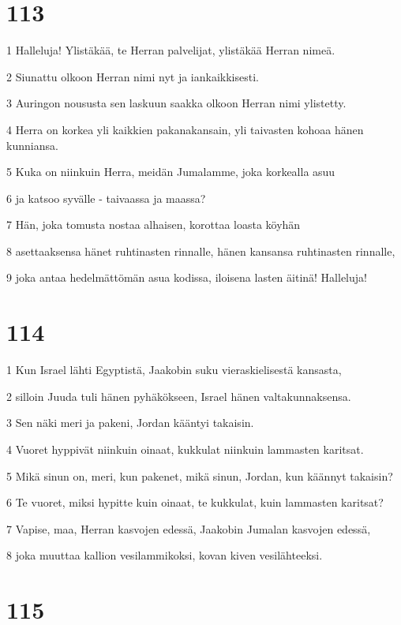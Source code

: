 \chapter{113}

\par 1 Halleluja! Ylistäkää, te Herran palvelijat, ylistäkää Herran nimeä.
\par 2 Siunattu olkoon Herran nimi nyt ja iankaikkisesti.
\par 3 Auringon noususta sen laskuun saakka olkoon Herran nimi ylistetty.
\par 4 Herra on korkea yli kaikkien pakanakansain, yli taivasten kohoaa hänen kunniansa.
\par 5 Kuka on niinkuin Herra, meidän Jumalamme, joka korkealla asuu
\par 6 ja katsoo syvälle - taivaassa ja maassa?
\par 7 Hän, joka tomusta nostaa alhaisen, korottaa loasta köyhän
\par 8 asettaaksensa hänet ruhtinasten rinnalle, hänen kansansa ruhtinasten rinnalle,
\par 9 joka antaa hedelmättömän asua kodissa, iloisena lasten äitinä! Halleluja!

\chapter{114}

\par 1 Kun Israel lähti Egyptistä, Jaakobin suku vieraskielisestä kansasta,
\par 2 silloin Juuda tuli hänen pyhäkökseen, Israel hänen valtakunnaksensa.
\par 3 Sen näki meri ja pakeni, Jordan kääntyi takaisin.
\par 4 Vuoret hyppivät niinkuin oinaat, kukkulat niinkuin lammasten karitsat.
\par 5 Mikä sinun on, meri, kun pakenet, mikä sinun, Jordan, kun käännyt takaisin?
\par 6 Te vuoret, miksi hypitte kuin oinaat, te kukkulat, kuin lammasten karitsat?
\par 7 Vapise, maa, Herran kasvojen edessä, Jaakobin Jumalan kasvojen edessä,
\par 8 joka muuttaa kallion vesilammikoksi, kovan kiven vesilähteeksi.

\chapter{115}


